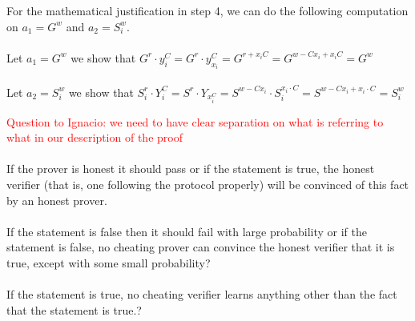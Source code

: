  For the mathematical justification in step 4, we can do the following computation on \begin{math}a_1=G^w\end{math} and \begin{math}a_2=S_i^w\end{math}.\\\\
Let \begin{math}a_1=G^w\end{math} we show that \begin{math}G^r \cdot y_i^C=G^r \cdot y_{x_i}^C=G^{r+x_iC}=G^{w-Cx_i+x_iC}=G^w\end{math}\\\\
Let \begin{math}a_2=S_i^w\end{math} we show that
\begin{math}S_i^r \cdot Y_i^C=S^r \cdot Y_{x_i^C}=S^{w-Cx_i} \cdot S_i^{x_i \cdot C}=S^{w-Cx_i+x_i \cdot C}=S_i^w\end{math}



\begin{infobox}
\textcolor{red}{Question to Ignacio: we need to have clear separation on what is referring to what in our description of the proof}\\\\
 If the prover is honest it should pass or if the statement is true, the honest verifier (that is, one following the protocol properly)
will be convinced of this fact by an honest prover.\\\\
If the statement is false then it should fail with large probability or if the statement is false, no cheating prover can convince
the honest verifier that it is true, except with some small probability?\\\\
 If the statement is true, no cheating verifier learns anything other than the fact that the statement is true.?
\end{infobox}
